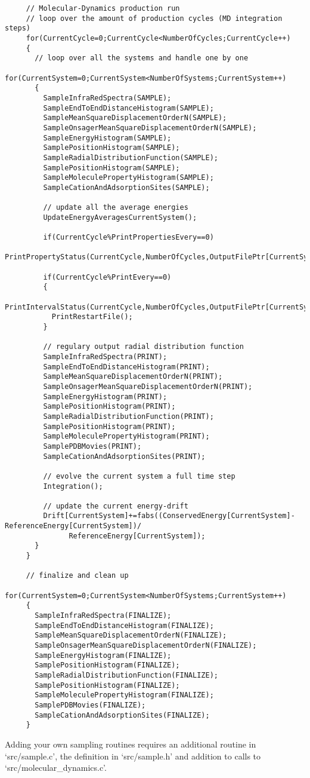 \begin{footnotesize}
\begin{verbatim}
     // Molecular-Dynamics production run
     // loop over the amount of production cycles (MD integration steps)
     for(CurrentCycle=0;CurrentCycle<NumberOfCycles;CurrentCycle++)
     {
       // loop over all the systems and handle one by one
       for(CurrentSystem=0;CurrentSystem<NumberOfSystems;CurrentSystem++)
       {
         SampleInfraRedSpectra(SAMPLE);
         SampleEndToEndDistanceHistogram(SAMPLE);
         SampleMeanSquareDisplacementOrderN(SAMPLE);
         SampleOnsagerMeanSquareDisplacementOrderN(SAMPLE);
         SampleEnergyHistogram(SAMPLE);
         SamplePositionHistogram(SAMPLE);
         SampleRadialDistributionFunction(SAMPLE);
         SamplePositionHistogram(SAMPLE);
         SampleMoleculePropertyHistogram(SAMPLE);
         SampleCationAndAdsorptionSites(SAMPLE);

         // update all the average energies
         UpdateEnergyAveragesCurrentSystem();

         if(CurrentCycle%PrintPropertiesEvery==0)
           PrintPropertyStatus(CurrentCycle,NumberOfCycles,OutputFilePtr[CurrentSystem]);

         if(CurrentCycle%PrintEvery==0)
         {
           PrintIntervalStatus(CurrentCycle,NumberOfCycles,OutputFilePtr[CurrentSystem]);
           PrintRestartFile();
         }

         // regulary output radial distribution function
         SampleInfraRedSpectra(PRINT);
         SampleEndToEndDistanceHistogram(PRINT);
         SampleMeanSquareDisplacementOrderN(PRINT);
         SampleOnsagerMeanSquareDisplacementOrderN(PRINT);
         SampleEnergyHistogram(PRINT);
         SamplePositionHistogram(PRINT);
         SampleRadialDistributionFunction(PRINT);
         SamplePositionHistogram(PRINT);
         SampleMoleculePropertyHistogram(PRINT);
         SamplePDBMovies(PRINT);
         SampleCationAndAdsorptionSites(PRINT);
   
         // evolve the current system a full time step
         Integration();

         // update the current energy-drift
         Drift[CurrentSystem]+=fabs((ConservedEnergy[CurrentSystem]-ReferenceEnergy[CurrentSystem])/
               ReferenceEnergy[CurrentSystem]);
       }
     }

     // finalize and clean up
     for(CurrentSystem=0;CurrentSystem<NumberOfSystems;CurrentSystem++)
     {
       SampleInfraRedSpectra(FINALIZE);
       SampleEndToEndDistanceHistogram(FINALIZE);
       SampleMeanSquareDisplacementOrderN(FINALIZE);
       SampleOnsagerMeanSquareDisplacementOrderN(FINALIZE);
       SampleEnergyHistogram(FINALIZE);
       SamplePositionHistogram(FINALIZE);
       SampleRadialDistributionFunction(FINALIZE);
       SamplePositionHistogram(FINALIZE);
       SampleMoleculePropertyHistogram(FINALIZE);
       SamplePDBMovies(FINALIZE);
       SampleCationAndAdsorptionSites(FINALIZE);
     }
\end{verbatim}
\end{footnotesize}
Adding your own sampling routines requires an additional routine in `src/sample.c', the definition in `src/sample.h' and addition to 
calls to `src/molecular\_dynamics.c'.

